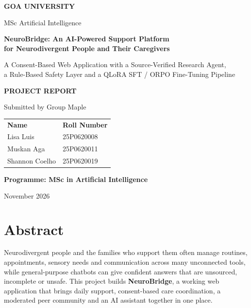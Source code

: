 \documentclass[11pt,a4paper]{article}
\newcommand{\teamrows}{%
  Lisa Luis & 25P0620008\\
  Muskan Aga & 25P0620011\\
  Shannon Coelho & 25P0620019\\
}
\begin{document}
\begin{titlepage}
\centering
\vspace*{1.2cm}
{\large\bfseries GOA UNIVERSITY\par}
\vspace{0.3cm}
{\normalsize MSc Artificial Intelligence\par}
\vspace{1.8cm}
{\LARGE\bfseries NeuroBridge: An AI-Powered Support Platform\\[4pt] for Neurodivergent People and Their Caregivers\par}
\vspace{0.9cm}
{\normalsize A Consent-Based Web Application with a Source-Verified Research Agent,\\
a Rule-Based Safety Layer and a QLoRA SFT / ORPO Fine-Tuning Pipeline\par}
\vspace{2.2cm}
{\Large\bfseries PROJECT REPORT\par}
\vspace{1.6cm}
{\normalsize Submitted by Group Maple\par}
\vspace{0.5cm}
\begin{tabular}{ll}
\textbf{Name} & \textbf{Roll Number}\\[2pt]
\teamrows
\end{tabular}
\vspace{2.2cm}

{\bfseries Programme: MSc in Artificial Intelligence\par}
\vfill
{\normalsize November 2026\par}
\end{titlepage}

\setcounter{page}{1}

\section*{Abstract}

Neurodivergent people and the families who support them often manage routines, appointments,
sensory needs and communication across many unconnected tools, while general-purpose chatbots
can give confident answers that are unsourced, incomplete or unsafe. This project builds
\textbf{NeuroBridge}, a working web application that brings daily support, consent-based care
coordination, a moderated peer community and an AI assistant together in one place.
\end{document}
